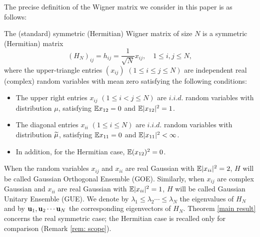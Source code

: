 The precise definition of the Wigner matrix we consider in this paper is as follows:
\begin{defn} \label{def: SWigner}
The (standard) symmetric (Hermitian) Wigner matrix of size $N$ is a symmetric (Hermitian) matrix 
$$
(H_N)_{ij}=h_{ij}=\frac{1}{\sqrt N} x_{ij},\quad  1\le i, j\leq N,
$$
where the upper-triangle entries $(x_{ij})$ $(1\le i\le j\leq N )$ are independent real (complex) random variables with mean zero satisfying the following conditions:
\begin{itemize}
\item The upper right entries $x_{ij}$ $(1\le i< j\le N)$ are $i.i.d.$ random variables with distribution $\mu$, satisfying $\mathbb{E} x_{12}=0$ 
and $\mathbb{E}|x_{12}|^2=1$. 
\item The diagonal entries $x_{ii}$ $(1\le i\le N) $ are $i.i.d.$ random variables with distribution $\widetilde \mu$, satisfying $\mathbb{E} x_{11}=0$ 
and $\mathbb{E}|x_{11}|^2 < \infty$.
\item In addition, for the Hermitian case, $\mathbb{E} (x_{12})^2=0$.
\end{itemize}

When the random variables $x_{ij}$ and $x_{ii}$ are real Gaussian with $\mathbb{E}|x_{ii}|^2 = 2$, $H$ will be called Gaussian Orthogonal Ensemble (GOE). Similarly, when $x_{ij}$ are complex Gaussian and $x_{ii}$ are real Gaussian with $\mathbb{E}|x_{ii}|^2 = 1$, $H$ will be called Gaussian Unitary Ensemble (GUE). We denote by $\lambda_1 \leq \lambda_2 \cdots \leq \lambda_N$ the eigenvalues of $H_N$ and by ${\bf u}_1, {\bf u}_2 \cdots {\bf u}_N$ the corresponding eigenvectors of $H_N$. 
Theorem \ref{main result} concerns the real symmetric case; the Hermitian case is recalled only for comparison (Remark \ref{rem: scope}).
\end{defn}

